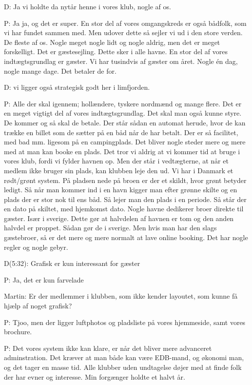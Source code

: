 \documentclass{article}
\begin{document}
D: Ja vi holdte da nytår henne i vores klub, nogle af os.

P: Ja ja, og det er super. En stor del af vores omgangskreds er også bådfolk, som vi har fundet sammen med. Men udover dette så sejler vi ud i den store verden. De fleste af os. Nogle meget nogle lidt og nogle aldrig, men det er meget forskelligt. Det er gæstesejling. Dette sker i alle havne. En stor del af vores indtægtsgrundlag er gæster. Vi har tusindvis af gæster om året. Nogle én dag, nogle mange dage. Det betaler de for.

D: vi ligger også strategisk godt her i limfjorden.

P: Alle der skal igennem; hollændere, tyskere nordmænd og mange flere. Det er en meget vigtigt del af vores indtægtsgrundlag. Det skal man også kunne styre. De kommer og så skal de betale. Der står sådan en automat herude, hvor de kan trække en billet som de sætter på en båd når de har betalt. Der er så facilitet, med bad mm. ligesom på en campingplads. Det bliver nogle steder mere og mere med at man kan booke en plads. Det tror vi aldrig at vi kommer tid at bruge i vores klub, fordi vi fylder havnen op. Men der står i vedtægterne, at når et medlem ikke bruger sin plads, kan klubben leje den ud. Vi har i Danmark et rødt/grønt system. På pladsen nede på broen er der et skildt, hvor grønt betyder ledigt. Så når man kommer ind i en havn kigger man efter grønne skilte og en plads der er stor nok til ens båd. Så lejer man den plads i en periode. Så står der en dato på skiltet, med hjemkomst dato.
Nogle havne dedikerer broer direkte til gæster. Især i sverige. Dette gør at halvdelen af havnen er tom og den anden halvdel er proppet. Sådan gør de i sverige. Men hvis man har den slags gæstebroer, så er det mere og mere normalt at lave online booking. Det har nogle regler og nogle gebyr.

D(5:32): Grafisk er kun interessant for gæster

P: Ja, det er kun farvelade

Martin: Er der medlemmer i klubben, som ikke kender layoutet, som kunne få hjælp af noget grafisk?

P: Tjoo, men der ligger luftphotos og pladsliste på vores hjemmeside, samt vores brochure.

P: Det vores system ikke kan klare, er når det bliver mere advanceret adminstration. Det kræver at man både kan være EDB-mand, og økonomi man, og det tager en masse tid. Alle klubber uden undtagelse døjer med at finde folk der har evner og interesse. Min forgænger holdte et halvt år.
\end{document}

